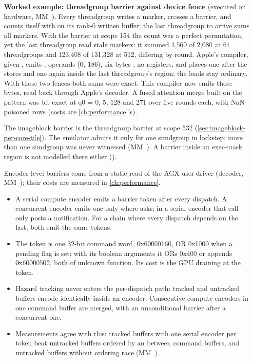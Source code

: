 \textbf{Worked example: threadgroup barrier against device fence} (executed on hardware, MM~). Every threadgroup
writes a marker, crosses a barrier, and counts itself with  on its rank-0
written buffer; the last threadgroup to arrive sums all markers. With the barrier at scope 154 the count was a perfect
permutation, yet the last threadgroup read stale markers: it summed 1,560 of 2,080 at 64 threadgroups and 123,408 of
131,328 at 512, differing by round. Apple's compiler, given
, emits , operands (0, 186), six
bytes , no registers, and places one after the stores and one again inside the last threadgroup's region;
the loads stay ordinary. With those two fences both sums were exact. This compiler now emits those bytes, read back
through Apple's decoder. A fused attention merge built on the pattern was bit-exact at q0 = 0, 5, 128 and 271 over five
rounds each, with NaN-poisoned rows (costs are \cref{ch:performance}'s).

The imageblock barrier is the threadgroup barrier at scope 532 (\cref{sec:imageblock-per-core-tile}). The emulator admits it only for one simdgroup in
lockstep; more than one simdgroup was never witnessed (MM~). A barrier inside an exec-mask region is not modelled
there either ().

Encoder-level barriers come from a static read of the AGX user driver (decoder, MM~); their costs are measured
in \cref{ch:performance}.

\begin{itemize}
\item A serial compute encoder emits a barrier token after every dispatch. A concurrent encoder emits one only where
   asks; in a serial encoder that call only posts a notification. For a chain where every
  dispatch depends on the last, both emit the same tokens.
\item The token is one 32-bit command word, 0x60000160, OR 0x1000 when a pending flag is set; with its boolean arguments it
  ORs 0x400 or appends 0x60000502, both of unknown function. Its cost is the GPU draining at the token.
\item Hazard tracking never enters the per-dispatch path: tracked and untracked buffers encode identically inside an encoder.
  Consecutive compute encoders in one command buffer are merged, with an unconditional barrier after a concurrent one.
\item Measurements agree with this: tracked buffers with one serial encoder per token beat untracked buffers ordered by an
   between command buffers, and untracked buffers without ordering race (MM~).
\end{itemize}

